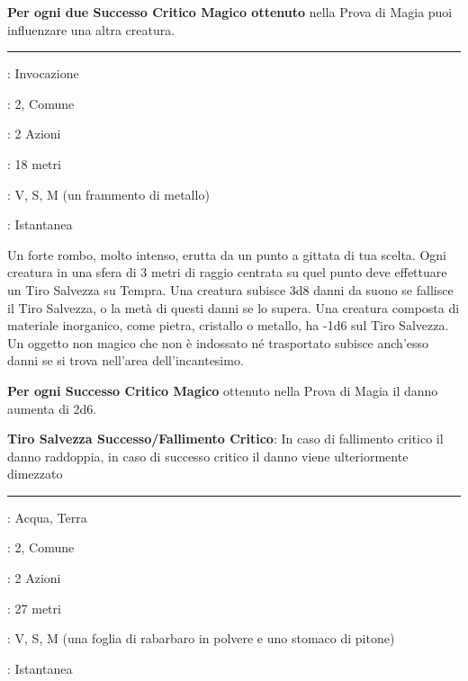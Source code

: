 \begin{multicols}{2}
\textbf{Per ogni due Successo Critico Magico ottenuto} nella Prova di Magia puoi influenzare una altra creatura.

\smallskip\noindent\rule{\linewidth}{2pt} \hypertarget{Frantumare}{}\medskip{}
\noindent
\begin{description}[noitemsep, topsep=0pt, parsep=0pt, partopsep=0pt, leftmargin=0cm, labelwidth=2.8cm]
	\item[\textbf{Lista di Magia}]: Invocazione
	\item[\textbf{Livello}]: 2, Comune
	\item[\textbf{T. di Lancio}]: 2 Azioni
	\item[\textbf{Gittata}]: 18 metri
	\item[\textbf{Componenti}]: V, S, M (un frammento di metallo)
	\item[\textbf{Durata}]: Istantanea
\end{description}

Un forte rombo, molto intenso, erutta da un punto a gittata di tua scelta. Ogni creatura in una sfera di 3 metri di raggio centrata su quel punto deve effettuare un Tiro Salvezza su Tempra. Una creatura subisce 3d8 danni da suono se fallisce il Tiro Salvezza, o la metà di questi danni se lo supera. Una creatura composta di materiale inorganico, come pietra, cristallo o metallo, ha -1d6 sul Tiro Salvezza. Un oggetto non magico che non è indossato né trasportato subisce anch'esso danni se si trova nell'area dell'incantesimo.

\textbf{Per ogni Successo Critico Magico} ottenuto nella Prova di Magia il danno aumenta di 2d6.

\textbf{Tiro Salvezza Successo/Fallimento Critico}: In caso di fallimento critico il danno raddoppia, in caso di successo critico il danno viene ulteriormente dimezzato

\smallskip\noindent\rule{\linewidth}{2pt} \hypertarget{Freccia Acida di Restser}{}\medskip{}
\noindent
\begin{description}[noitemsep, topsep=0pt, parsep=0pt, partopsep=0pt, leftmargin=0cm, labelwidth=2.8cm]
	\item[\textbf{Lista di Magia}]: Acqua, Terra
	\item[\textbf{Livello}]: 2, Comune
	\item[\textbf{T. di Lancio}]: 2 Azioni
	\item[\textbf{Gittata}]: 27 metri
	\item[\textbf{Componenti}]: V, S, M (una foglia di rabarbaro in polvere e uno stomaco di pitone)
	\item[\textbf{Durata}]: Istantanea
\end{description}


\end{multicols}
